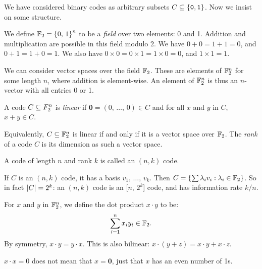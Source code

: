 \documentclass{article}
\begin{document}
We have considered binary codes as arbitrary subsets $C \subseteq \left\lbrace \texttt{0}, \texttt{1} \right\rbrace$.
Now we insist on some structure.

\begin{definition}
	\label{field-of-two-elements}
    We define $\mathbb{F}_2 = \left\lbrace 0, \, 1 \right\rbrace^n$ to be a \textit{field}
    over two elements: 0 and 1.
    Addition and multiplication are possible in this field modulo 2.
    We have $0 + 0 = 1 + 1 = 0$, and $0 + 1 = 1 + 0 = 1$.
    We also have $0 \times 0 = 0 \times 1 = 1 \times 0 = 0$, and $1 \times 1 = 1$.
\end{definition}

We can consider vector spaces over the field $\mathbb{F}_2$.
These are elements of $\mathbb{F}_2^n$ for some length $n$,
where addition is element-wise.
An element of $\mathbb{F}_2^n$ is thus an $n$-vector with all entries 0 or 1.

\begin{definition}
    A code $C \subseteq F_2^n$ is \textit{linear}
    if $\mathbf{0} = (0, \, \dots, \, 0) \in C$ and
    for all $x$ and $y$ in $C$, $x + y \in C$.
    
    Equivalently, $C \subseteq \mathbb{F}_2^n$ is linear
    if and only if it is a vector space over $\mathbb{F}_2$.
    The \textit{rank} of a code $C$ is its dimension as such a vector space.
\end{definition}

\begin{note}
	A code of length $n$ and rank $k$ is called an $(n, k)$ code.
\end{note}

\begin{corollary}
    If $C$ is an $(n, k)$ code, it has a basis $v_1, \, \dots, \, v_k$.
    Then $C = \left\lbrace \sum \lambda_i v_i : \lambda_i \in \mathbb{F}_2 \right\rbrace$.
    So in fact $\left\lvert C \right\rvert = 2^k$: an $(n, k)$ code is an [$n$, $2^k$] code,
    and has information rate $k/n$.
\end{corollary}

\begin{definition}
    For $x$ and $y$ in $\mathbb{F}_2^n$, we define the dot product $x \cdot y$ to be:
    \[
	\sum_{i=1}^n x_i y_i \in \mathbb{F}_2.
	\]
	By symmetry, $x \cdot y = y \cdot x$.
	This is also bilinear: $x \cdot (y + z) = x \cdot y + x \cdot z$.
\end{definition}

\begin{note}
	$x \cdot x = 0$ does not mean that $x = \textbf{0}$,
	just that $x$ has an even number of 1s.
\end{note}
\end{document}
